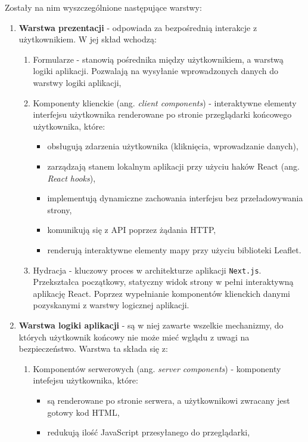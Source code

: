 Zostały na nim wyszczególnione następujące warstwy:
\begin{enumerate}
    \item \textbf{Warstwa prezentacji} - odpowiada za bezpośrednią interakcje z użytkownikiem. W jej skład wchodzą:
    \begin{enumerate}
        \item Formularze - stanowią pośrednika między użytkownikiem, a warstwą logiki aplikacji. Pozwalają na wysyłanie wprowadzonych danych do warstwy logiki aplikacji,
        \item Komponenty klienckie (ang. \emph{client components}) - interaktywne elementy interfejsu użytkownika renderowane po stronie przeglądarki końcowego użytkownika, które:
        \begin{itemize}
            \item obsługują zdarzenia użytkownika (kliknięcia, wprowadzanie danych),
            \item zarządzają stanem lokalnym aplikacji przy użyciu haków React (ang. \emph{React hooks}),
            \item implementują dynamiczne zachowania interfejsu bez przeładowywania strony,
            \item komunikują się z API poprzez żądania HTTP,
            \item renderują interaktywne elementy mapy przy użyciu biblioteki Leaflet.
        \end{itemize}
        \item Hydracja - kluczowy proces w architekturze aplikacji \texttt{Next.js}. Przekształca początkowy, statyczny widok strony w pełni interaktywną aplikację React. Poprzez wypełnianie komponentów klienckich danymi pozyskanymi z warstwy logicznej aplikacji.
    \end{enumerate}
    \item \textbf{Warstwa logiki aplikacji} - są w niej zawarte wszelkie mechanizmy, do których użytkownik końcowy nie może mieć wglądu z uwagi na bezpieczeństwo. Warstwa ta składa się z:
    \begin{enumerate}
        \item Komponentów serwerowych (ang. \emph{server components}) - komponenty intefejsu użytkownika, które:
        \begin{itemize}
            \item są renderowane po stronie serwera, a użytkownikowi zwracany jest gotowy kod HTML,
            \item redukują ilość JavaScript przesyłanego do przeglądarki,

\end{itemize}
\end{enumerate}
\end{enumerate}
